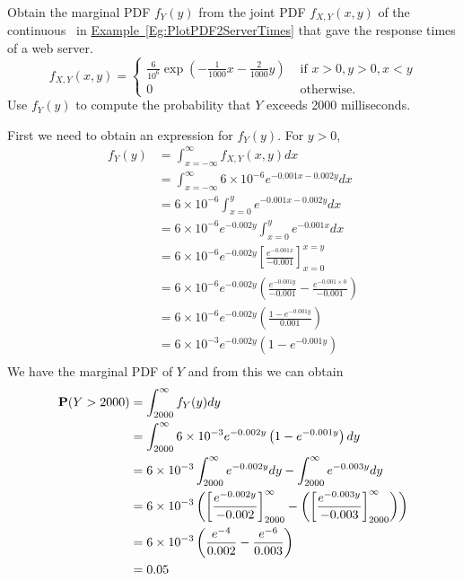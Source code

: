 \begin{example}\label{EgGetMarginalFromJointContServerTimes}
Obtain the marginal PDF $f_Y(y)$ from the joint PDF $f_{X,Y}(x,y)$ of the continuous \rv~in \hyperref[Eg:PlotPDF2ServerTimes]{Example~\ref*{Eg:PlotPDF2ServerTimes}} that gave the response times of a web server.
\[
f_{X,Y}(x,y) = 
\begin{cases}
\frac{6}{10^6} \exp \left( -\frac{1}{1000}x-\frac{2}{1000}y \right)
& \text{ if } x>0,y>0,x <y\\
0 & \text{ otherwise}.
\end{cases}
\]
Use $f_Y(y)$ to compute the probability that $Y$ exceeds 2000 milliseconds.

First we need to obtain an expression for $f_Y(y)$. For $y > 0$,
{\scriptsize
\begin{align*}
f_Y(y) 
&= \int_{x=-\infty}^{\infty} f_{X,Y}(x,y) dx\\
&= \int_{x=-\infty}^{\infty} 6 \times 10^{-6} e^{-0.001 x - 0.002y} dx\\
&= 6 \times 10^{-6} \int_{x=0}^{y} e^{-0.001 x - 0.002y} dx\\ 
&= 6 \times 10^{-6} e^{-0.002y} \int_{x=0}^{y}  e^{-0.001 x} dx\\ 
&= 6 \times 10^{-6} e^{-0.002y} \left[ \frac{e^{-0.001 x}}{-0.001}\right]_{x=0}^{x=y}\\ 
&= 6 \times 10^{-6} e^{-0.002y} \left( \frac{e^{-0.001 y}}{-0.001} - \frac{e^{-0.001 \times 0}}{-0.001} \right)\\ 
&= 6 \times 10^{-6} e^{-0.002y} \left( \frac{1- e^{-0.001 y}}{0.001} \right)\\ 
&= 6 \times 10^{-3} e^{-0.002y} \left({1- e^{-0.001 y}} \right)\\ 
\end{align*}
}
We have the marginal PDF of $Y$ and from this we can obtain 
{\scriptsize
\begin{align*}
\mathbf{P}(Y>2000)
&= \int_{2000}^{\infty} f_Y(y) dy \\
&= \int_{2000}^{\infty} 6 \times 10^{-3} e^{-0.002y} \left({1- e^{-0.001 y}} \right) dy\\
&= 6 \times 10^{-3} \int_{2000}^{\infty}  e^{-0.002y} dy - \int_{2000}^{\infty} e^{-0.003 y} dy\\
&= 6 \times 10^{-3} \left( \left[ \frac{e^{-0.002y}}{-0.002} \right]_{2000}^{\infty} 
- \left( \left[ \frac{e^{-0.003y}}{-0.003} \right]_{2000}^{\infty} \right) \right)\\
&= 6 \times 10^{-3} \left( \frac{e^{-4}}{0.002} - \frac{e^{-6}}{0.003} \right)\\
&= 0.05
\end{align*}
}


\end{example}
